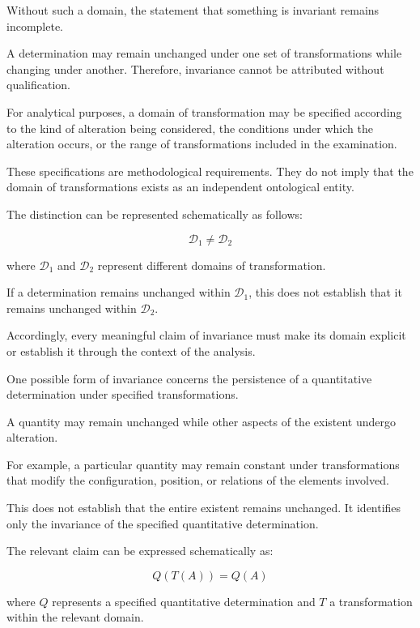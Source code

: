Without such a domain, the statement that
something is invariant remains incomplete.

A determination may remain unchanged under
one set of transformations while changing
under another. Therefore, invariance cannot
be attributed without qualification.

For analytical purposes, a domain of
transformation may be specified according
to the kind of alteration being considered,
the conditions under which the alteration
occurs, or the range of transformations
included in the examination.

These specifications are methodological
requirements. They do not imply that
the domain of transformations exists as
an independent ontological entity.

The distinction can be represented
schematically as follows:

\[
\mathcal{D}_1 \neq \mathcal{D}_2
\]

where \(\mathcal{D}_1\) and \(\mathcal{D}_2\)
represent different domains of transformation.

If a determination remains unchanged
within \(\mathcal{D}_1\), this does not
establish that it remains unchanged
within \(\mathcal{D}_2\).

Accordingly, every meaningful claim
of invariance must make its domain
explicit or establish it through
the context of the analysis.


One possible form of invariance concerns
the persistence of a quantitative
determination under specified transformations.

A quantity may remain unchanged while
other aspects of the existent undergo
alteration.

For example, a particular quantity
may remain constant under transformations
that modify the configuration, position,
or relations of the elements involved.

This does not establish that the entire
existent remains unchanged. It identifies
only the invariance of the specified
quantitative determination.

The relevant claim can be expressed
schematically as:

\[
Q(T(A)) = Q(A)
\]

where \(Q\) represents a specified
quantitative determination and \(T\)
a transformation within the relevant
domain.

